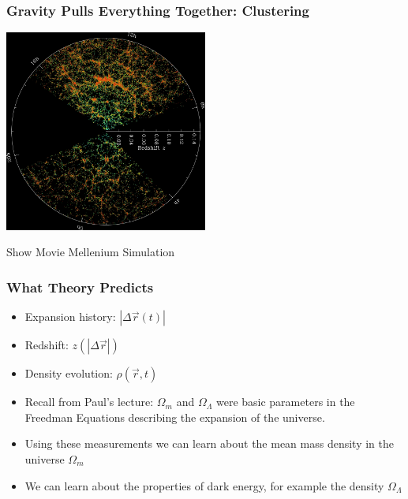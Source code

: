 \documentclass{beamer}
\begin{document}
\frame
{

    \frametitle{Gravity Pulls Everything Together: Clustering}



    \begin{center}
        \includegraphics[width=0.5\textwidth]{orangepie.jpg}
    \end{center}

    Show Movie Mellenium Simulation

}


\frame
{

    \frametitle{What Theory Predicts}


    \begin{itemize}

            

        \item Expansion history: {\color{gold} $|\Delta \vec{r} (t)|$ }


        \item Redshift: {\color{gold} $z(|\Delta \vec{r}|)$}


        \item Density evolution: {\color{gold} $\rho(\vec{r},t)$}

        \item Recall from Paul's lecture: {\color{gold} $\Omega_m$} and
            {\color{gold} $\Omega_\Lambda$} were basic parameters in the
            Freedman Equations describing the expansion of the universe.


        \item Using these measurements we can learn about the mean mass density in
            the universe {\color{gold} $\Omega_m$}
            
        \item We can learn about the properties of dark energy, for example
            the density {\color{gold} $\Omega_\Lambda$}



    \end{itemize}

}
\end{document}
